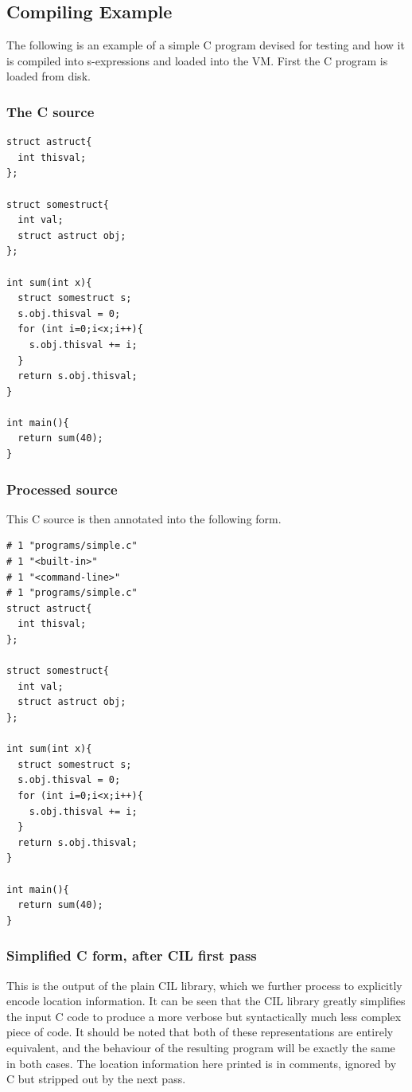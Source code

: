 \documentclass[10pt,a4paper]{report}
\begin{document}
\subsection{Compiling Example}
The following is an example of a simple C program devised for testing and how it is compiled into s-expressions and loaded into the VM. First the C program is loaded from disk.

\subsubsection{The C source}
\begin{verbatim}
struct astruct{
  int thisval;
};

struct somestruct{
  int val;
  struct astruct obj;
};

int sum(int x){
  struct somestruct s;
  s.obj.thisval = 0;
  for (int i=0;i<x;i++){
    s.obj.thisval += i;
  }
  return s.obj.thisval;
}

int main(){
  return sum(40);
}
\end{verbatim}

\subsubsection{Processed source}
This C source is then annotated into the following form.
\begin{verbatim}
# 1 "programs/simple.c"
# 1 "<built-in>"
# 1 "<command-line>"
# 1 "programs/simple.c"
struct astruct{
  int thisval;
};

struct somestruct{
  int val;
  struct astruct obj;
};

int sum(int x){
  struct somestruct s;
  s.obj.thisval = 0;
  for (int i=0;i<x;i++){
    s.obj.thisval += i;
  }
  return s.obj.thisval;
}

int main(){
  return sum(40);
}
\end{verbatim}

\subsubsection{Simplified C form, after CIL first pass}
This is the output of the plain CIL library, which we further process to explicitly encode location information. It can be seen that the CIL library greatly simplifies the input C code to produce a more verbose but syntactically much less complex piece of code. It should be noted that both of these representations are entirely equivalent, and the behaviour of the resulting program will be exactly the same in both cases. The location information here printed is in comments, ignored by C but stripped out by the next pass.
\end{document}
